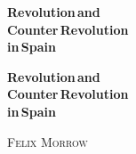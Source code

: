 

\begin{titlepage}
	\setlength{\parindent}{0pt}
	
	\vspace*{\fill}
	
	{\bfseries\sffamily\fontsize{42}{42}\selectfont
		Revolution\,\textnormal{and} \\
		Counter\,Revolution \\
		\textnormal{in}\,Spain
		\par}
	
	\vspace{11pt}
	\vspace{21pt}
	
	\vspace*{\fill}
	
\end{titlepage}

\begin{titlepage}
  \setlength{\parindent}{0pt}

  \vspace*{\fill}

  {\bfseries\sffamily\fontsize{42}{42}\selectfont
    Revolution\,\textnormal{and} \\
    Counter\,Revolution \\
    \textnormal{in}\,Spain
  \par}

  \vspace{11pt}

  {\normalfont\fontsize{21}{21}\selectfont
    \textsc{Felix Morrow}
  \par}

  \vspace*{\fill}

\end{titlepage}